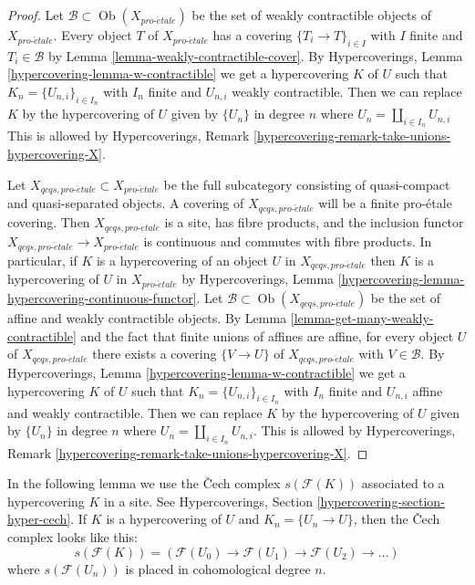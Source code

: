 \documentclass{stacks-project}
\theoremstyle{plain}
\theoremstyle{definition}
\theoremstyle{remark}
\numberwithin{equation}{subsection}
\def\Ob{\mathop{\mathrm{Ob}}\nolimits}
\def\proetale{{pro\text{-}\acute{e}tale}}
\begin{document}
\begin{proof}
Let $\mathcal{B} \subset \Ob(X_\proetale)$ be the set of weakly contractible
objects of $X_\proetale$. Every object $T$ of $X_\proetale$ has a
covering $\{T_i \to T\}_{i \in I}$ with $I$ finite and $T_i \in \mathcal{B}$ by
Lemma \ref{lemma-weakly-contractible-cover}.
By Hypercoverings, Lemma \ref{hypercovering-lemma-w-contractible}
we get a hypercovering $K$ of $U$ such that $K_n = \{U_{n, i}\}_{i \in I_n}$
with $I_n$ finite and $U_{n, i}$ weakly contractible.
Then we can replace $K$ by the hypercovering of $U$ given by $\{U_n\}$
in degree $n$ where $U_n = \coprod_{i \in I_n} U_{n, i}$
This is allowed by
Hypercoverings, Remark \ref{hypercovering-remark-take-unions-hypercovering-X}.

\medskip\noindent
Let $X_{qcqs, \proetale} \subset X_\proetale$ be the full subcategory
consisting of quasi-compact and quasi-separated objects.
A covering of $X_{qcqs, \proetale}$ will be a finite pro-\'etale covering.
Then $X_{qcqs, \proetale}$ is a site, has fibre products, and
the inclusion functor $X_{qcqs, \proetale} \to X_\proetale$ is continuous
and commutes with fibre products.
In particular, if $K$ is a hypercovering of an object $U$ in
$X_{qcqs, \proetale}$ then $K$ is a hypercovering of $U$ in $X_\proetale$
by Hypercoverings, Lemma
\ref{hypercovering-lemma-hypercovering-continuous-functor}.
Let $\mathcal{B} \subset \Ob(X_{qcqs, \proetale})$ be the set of
affine and weakly contractible objects. By 
Lemma \ref{lemma-get-many-weakly-contractible}
and the fact that finite unions of affines are affine,
for every object $U$ of $X_{qcqs, \proetale}$ there exists a covering
$\{V \to U\}$ of $X_{qcqs, \proetale}$ with $V \in \mathcal{B}$.
By Hypercoverings, Lemma \ref{hypercovering-lemma-w-contractible}
we get a hypercovering $K$ of $U$ such that $K_n = \{U_{n, i}\}_{i \in I_n}$
with $I_n$ finite and $U_{n, i}$ affine and weakly contractible.
Then we can replace $K$ by the hypercovering of $U$
given by $\{U_n\}$ in degree $n$ where
$U_n = \coprod_{i \in I_n} U_{n, i}$. This is allowed by
Hypercoverings, Remark \ref{hypercovering-remark-take-unions-hypercovering-X}.
\end{proof}

\noindent
In the following lemma we use the {\v C}ech complex $s(\mathcal{F}(K))$
associated to a hypercovering $K$ in a site. See
Hypercoverings, Section \ref{hypercovering-section-hyper-cech}.
If $K$ is a hypercovering of $U$ and $K_n = \{U_n \to U\}$, then
the {\v C}ech complex looks like this:
$$
s(\mathcal{F}(K)) =
\left(
\mathcal{F}(U_0) \to \mathcal{F}(U_1) \to \mathcal{F}(U_2) \to \ldots
\right)
$$
where $s(\mathcal{F}(U_n))$ is placed in cohomological degree $n$.
\end{document}

